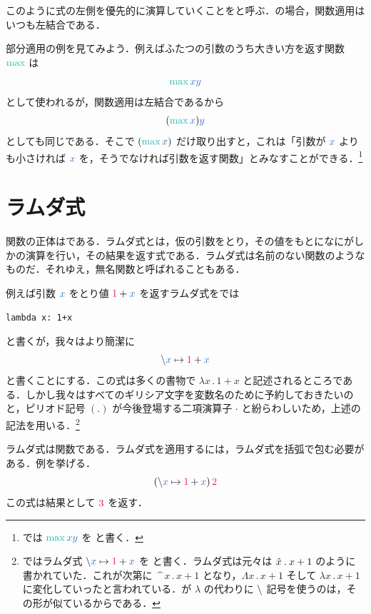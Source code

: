 \documentclass[a5paper,twoside,fleqn,draft]{jsbook}
\begin{document}
このように式の左側を優先的に演算していくことをと呼ぶ．\haskell の場合，関数適用はいつも左結合である．

部分適用の例を見てみよう．例えばふたつの引数のうち大きい方を返す関数
$\hMax$ は
\begin{equation}
  \hMax\hVar{x}\hVar{y}
\end{equation}
として使われるが，関数適用は左結合であるから
\begin{equation}
  (\hMax\hVar{x})\hVar{y}
\end{equation}
としても同じである．そこで $(\hMax\hVar{x})$ だけ取り出すと，これは「引数が $\hVar{x}$ よりも小さければ $\hVar{x}$ を，そうでなければ引数を返す関数」とみなすことができる．\footnote{\haskell では $\hMax\hVar{x}\hVar{y}$ を  と書く．}

\section{ラムダ式}

関数の正体はである．ラムダ式とは，仮の引数をとり，その値をもとになにがしかの演算を行い，その結果を返す式である．ラムダ式は名前のない関数のようなものだ．それゆえ，無名関数と呼ばれることもある．

例えば引数 $\hVar{x}$ をとり値 $\hConstant{1}+\hVar{x}$ を返すラムダ式を\python では
\begin{pythoncode}
\begin{verbatim}
lambda x: 1+x
\end{verbatim}
\end{pythoncode}
と書くが，我々はより簡潔に
\begin{equation}
  \hLambdaSyntax{\hVar{x}}{\hConstant{1}+\hVar{x}}
\end{equation}
と書くことにする．この式は多くの書物で $\lambda x\mathbin{.}1+x$ と記述されるところである．しかし我々はすべてのギリシア文字を変数名のために予約しておきたいのと，ピリオド記号 $(.)$ が今後登場する二項演算子 $\cdot$ と紛らわしいため，上述の記法を用いる．\footnote{\haskell ではラムダ式 $\hLambdaSyntax{\hVar{x}}{\hConstant{1}+\hVar{x}}$ を  と書く．ラムダ式は元々は $\Hat{x}\mathbin{.}x+1$ のように書かれていた．これが次第に $\mathop{\texttt{\textasciicircum}}x\mathbin{.}x+1$ となり，$\Lambda x\mathbin{.}x+1$ そして $\lambda x\mathbin{.}x+1$ に変化していったと言われている．\haskell が $\lambda$ の代わりに $\backslash$ 記号を使うのは，その形が似ているからである．}

ラムダ式は関数である．ラムダ式を適用するには，ラムダ式を括弧で包む必要がある．例を挙げる．
\begin{equation}
  (\hLambdaSyntax{\hVar{x}}{\hConstant{1}+\hVar{x}})\,\hConstant{2}
\end{equation}
この式は結果として $\hConstant{3}$ を返す．
\end{document}

